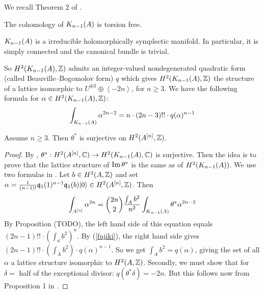 We recall Theorem 2 of \cite{Spanier}.
\begin{theorem}\label{torsion}
The cohomology of $\kum{A}{n-1}$ is torsion free. 
\end{theorem}

\begin{theorem}\cite{Beauville}
$\kum{A}{n-1}$ is a irreducible holomorphically symplectic manifold. In particular, it is simply connected and the canonical bundle is trivial.
\end{theorem}
So $H^2(\kum{A}{n-1},\Z)$ admits an integer-valued nondegenerated quadratic form (called Beauville--Bogomolov form) $q$ which gives $H^2(\kum{A}{n-1},\Z)$ the structure of a lattice isomorphic to $U^{\oplus 3}\oplus \left< -2n \right>$, for $n\geq 3$. We have the following formula for $\alpha\in H^2(\kum{A}{n-1},\Z)$:
\begin{equation} \label{fujiki}
\int_{\kum{A}{n-1}} \alpha^{2n-2} = n\cdot(2n-3)!!\cdot q(\alpha)^{n-1}
\end{equation}



\begin{proposition}\label{H2Sur} Assume $n\geq 3$. Then
$\theta^*$ is surjective on $H^2(A\hilb{n},\Z)$.
\end{proposition}
\begin{proof}
By \cite[Sect.~7]{Beauville}, $\theta^{\ast} : H^2(A\hilb{n},\C) \rightarrow H^2(\kum{A}{n-1},\C)$ is surjective. 
Then the idea is to prove that the lattice structure of $\im \theta^*$ is the same as of $H^2(\kum{A}{n-1})$.
We use two formulas in \cite[pp.~8--11]{Britze}. Let $b\in H^2(A,\Z)$ and set $\alpha = \frac{1}{(n-1)!}\kq_{1}(1)^{n-1}\kq_1(b)\vac\in H^2(A\hilb{n},\Z)$. Then  
\begin{equation} 
\int_{A\hilb{n}}\alpha^{2n} = \binom{2n}{2} \frac{\int_A b^2}{n^2} \int_{\kum{A}{n-1}} \theta^* \alpha^{2n-2}
\end{equation}
By Proposition (TODO), the left hand side of this equation equals $(2n-1)!!\cdot \left(\int_a b^2\right)^n$. By (\ref{fujiki}), the right hand side gives $(2n-1)!! \cdot \left(\int_A b^2\right) \cdot q(\alpha)^{n-1}$. So
we get
$\int_A b^2 = q(\alpha)$, giving the set of all $\alpha$ a lattice structure isomorphic to $H^2(A,\Z)$. 
Secondly, we must show that for $\delta=$ half of the exceptional divisor: $q(\theta^*\delta) = -2n$. But this follows now from Proposition 1 in \cite{Britze}.
\end{proof}

